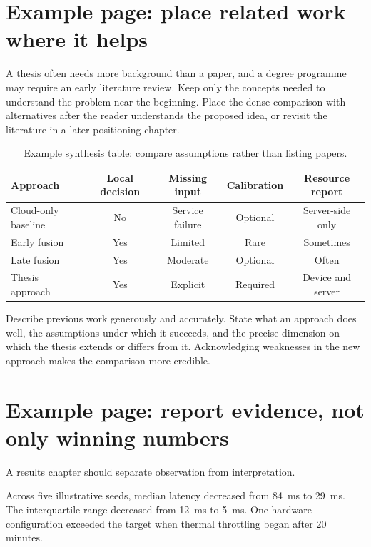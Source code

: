 \clearpage
\section{Example page: place related work where it helps}
A thesis often needs more background than a paper, and a degree programme may
require an early literature review. Keep only the concepts needed to understand
the problem near the beginning. Place the dense comparison with alternatives
after the reader understands the proposed idea, or revisit the literature in a
later positioning chapter.

\begin{table}[htbp]
\centering
\caption{Example synthesis table: compare assumptions rather than listing papers.}
\label{tab:guide-related-en}
\begin{tabularx}{\textwidth}{Ycccc}
\toprule
Approach & Local decision & Missing input & Calibration & Resource report\\
\midrule
Cloud-only baseline & No & Service failure & Optional & Server-side only\\
Early fusion & Yes & Limited & Rare & Sometimes\\
Late fusion & Yes & Moderate & Optional & Often\\
Thesis approach & Yes & Explicit & Required & Device and server\\
\bottomrule
\end{tabularx}
\end{table}

Describe previous work generously and accurately. State what an approach does
well, the assumptions under which it succeeds, and the precise dimension on
which the thesis extends or differs from it. Acknowledging weaknesses in the
new approach makes the comparison more credible.

\section{Example page: report evidence, not only winning numbers}
A results chapter should separate observation from interpretation.

\begin{resultbox}[Observation]
Across five illustrative seeds, median latency decreased from 84~ms to 29~ms.
The interquartile range decreased from 12~ms to 5~ms. One hardware configuration
exceeded the target when thermal throttling began after 20 minutes.
\end{resultbox}

